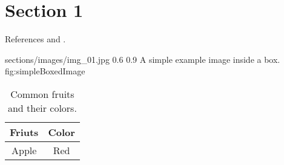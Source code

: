 \documentclass[../../../main.tex]{subfiles}
\begin{document}
\section{Section 1}
References \parencite{Ref01}  and \parencite{Ref02}.

\begin{centerBoxImageStyle}
    {sections/images/img_01.jpg}     
    {0.6\linewidth}                         
    {0.9\linewidth}                         
    {A simple example image inside a box.}  
    {fig:simpleBoxedImage}               
\end{centerBoxImageStyle}

\begin{center}
    \begin{table}[h!] %
        \begin{tabular}{|c|c|}     \hline
            Friuts & Color          \\ \hline
            Apple & Red             \\ \hline
        \end{tabular}
        \caption{Common fruits and their colors.}
    \end{table}
\end{center}
\end{document}
